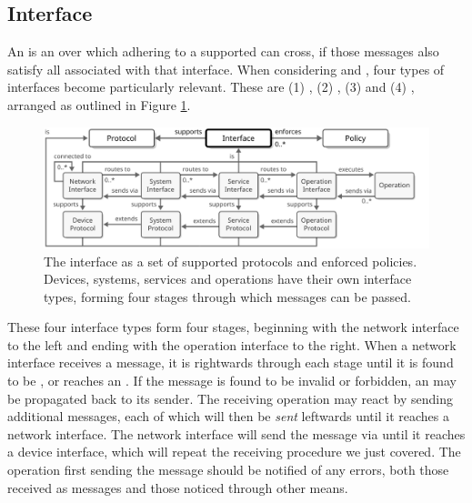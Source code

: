 \vspace*{-6mm}

\subsection{Interface}
\label{sec:concepts:interface}

An  is an   over which  adhering to a supported  can cross, if those messages also satisfy all  associated with that interface.
When considering   and , four types of interfaces become particularly relevant.
These are (1) , (2) , (3)  and (4) , arranged as outlined in Figure \ref{fig:interface}.

\vfill

\begin{figure}[ht!]
  \centering
  \includegraphics[scale=0.9]{figures/interface}
  \caption{
    The interface as a set of supported protocols and enforced policies.
    Devices, systems, services and operations have their own interface types, forming four stages through which messages can be passed.
  }
  \label{fig:interface}
\end{figure}

These four interface types form four stages, beginning with the network interface to the left and ending with the operation interface to the right.
When a network interface receives a message, it is  rightwards through each stage until it is found to be ,  or reaches an .
If the message is found to be invalid or forbidden, an  may be propagated back to its sender.
The receiving operation may react by sending additional messages, each of which will then be \textit{sent} leftwards until it reaches a network interface.
The network interface will send the message via  until it reaches a device interface, which will repeat the receiving procedure we just covered.
The operation first sending the message should be notified of any errors, both those received as messages and those noticed through other means.

